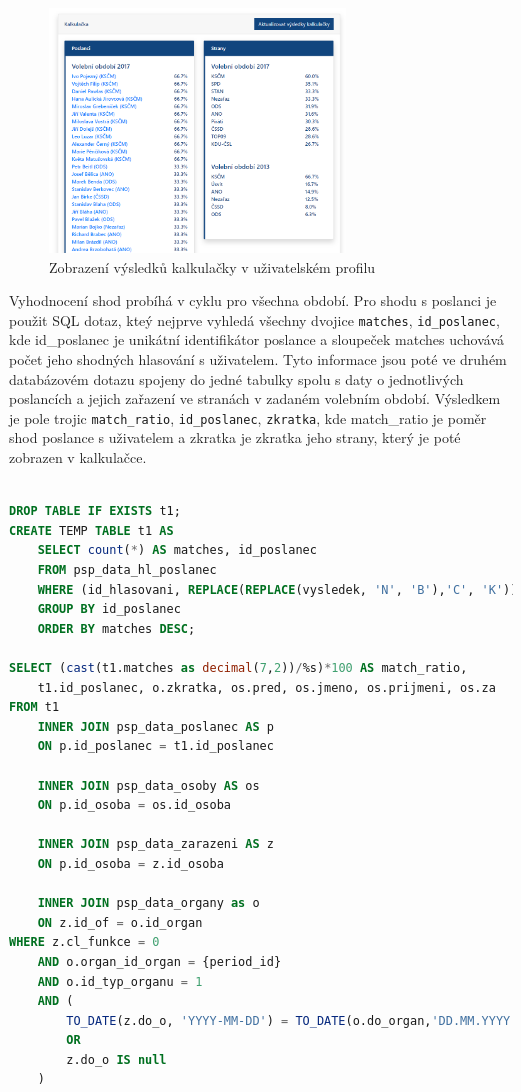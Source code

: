 \begin{figure}[H]
    \centering
    \includegraphics[width=0.7\textwidth]{obrazky-figures/aplikace-kalkulacka.png}
    \caption{Zobrazení výsledků kalkulačky v uživatelském profilu}
    \label{fig:aplikace-kalkulacka}
\end{figure}

\par Vyhodnocení shod probíhá v cyklu pro všechna období. Pro shodu s poslanci je použit SQL dotaz, kteý nejprve vyhledá všechny dvojice \texttt{matches}, \texttt{id\_poslanec}, kde id\_poslanec je unikátní identifikátor poslance a sloupeček matches uchovává počet jeho shodných hlasování s uživatelem. Tyto informace jsou poté ve druhém databázovém dotazu spojeny do jedné tabulky spolu s daty o jednotlivých poslancích a jejich zařazení ve stranách v zadaném volebním období. Výsledkem je pole trojic \texttt{match\_ratio}, \texttt{id\_poslanec}, \texttt{zkratka}, kde match\_ratio je poměr shod poslance s uživatelem a zkratka je zkratka jeho strany, který je poté zobrazen v kalkulačce.

\begin{lstlisting}[language=SQL, caption={SQL dotaz na vyhledání shod uživatele s poslanci}, label=code:sql-shoda-poslanci]

DROP TABLE IF EXISTS t1;
CREATE TEMP TABLE t1 AS   
    SELECT count(*) AS matches, id_poslanec 
    FROM psp_data_hl_poslanec
    WHERE (id_hlasovani, REPLACE(REPLACE(vysledek, 'N', 'B'),'C', 'K')) IN %s
    GROUP BY id_poslanec 
    ORDER BY matches DESC;
    
SELECT (cast(t1.matches as decimal(7,2))/%s)*100 AS match_ratio, 
    t1.id_poslanec, o.zkratka, os.pred, os.jmeno, os.prijmeni, os.za
FROM t1
    INNER JOIN psp_data_poslanec AS p
    ON p.id_poslanec = t1.id_poslanec

    INNER JOIN psp_data_osoby AS os
    ON p.id_osoba = os.id_osoba

    INNER JOIN psp_data_zarazeni AS z 
    ON p.id_osoba = z.id_osoba

    INNER JOIN psp_data_organy as o
    ON z.id_of = o.id_organ
WHERE z.cl_funkce = 0
    AND o.organ_id_organ = {period_id}
    AND o.id_typ_organu = 1
    AND (
        TO_DATE(z.do_o, 'YYYY-MM-DD') = TO_DATE(o.do_organ,'DD.MM.YYYY')
        OR 
        z.do_o IS null
    )
\end{lstlisting}

